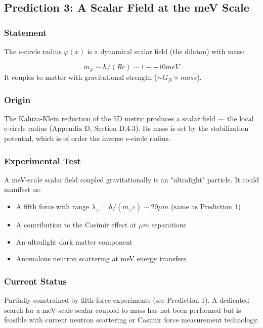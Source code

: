 \documentclass[aps,prd,preprint,superscriptaddress,longbibliography,floatfix]{revtex4-2}
\theoremstyle{remark}
\begin{document}
\subsection{Prediction 3: A Scalar Field at the meV Scale}


\subsubsection{Statement}

The e-circle radius $\varphi(x)$ is a dynamical scalar field (the dilaton) with mass:


\begin{equation}
    m_\varphi \sim  \hbar/(Rc) \sim  1--10 meV
\end{equation}
It couples to matter with gravitational strength ($\sim G_N \times mass$).


\subsubsection{Origin}

The Kaluza-Klein reduction of the 5D metric produces a scalar field --- the local e-circle radius (Appendix D, Section D.4.3). Its mass is set by the stabilization potential, which is of order the inverse e-circle radius.


\subsubsection{Experimental Test}

A meV-scale scalar field coupled gravitationally is an "ultralight" particle. It could manifest as:

\begin{itemize}
  \item A fifth force with range $\lambda_\varphi = \hbar/(m_\varphi c) \sim  20 \mu m$ (same as Prediction 1)
  \item A contribution to the Casimir effect at $\mu m$ separations
  \item An ultralight dark matter component
  \item Anomalous neutron scattering at meV energy transfers
\end{itemize}


\subsubsection{Current Status}

Partially constrained by fifth-force experiments (see Prediction 1). A dedicated search for a meV-scale scalar coupled to mass has not been performed but is feasible with current neutron scattering or Casimir force measurement technology.
\end{document}
